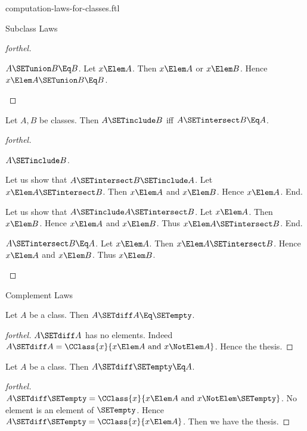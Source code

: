 \documentclass{stex}
\begin{document}
\begin{smodule}{computation-laws-for-classes.ftl}
\begin{sfragment}{Subclass Laws}
\begin{proof}[forthel]
    \begin{case}{$A \SETunion B \Eq B$.}
      Let $x \Elem A$.
      Then $x \Elem A$ or $x \Elem B$.
      Hence $x \Elem A \SETunion B \Eq B$.
    \end{case}
  \end{proof}

  \begin{proposition}[forthel]
    Let $A, B$ be classes.
    Then $A \SETinclude B$ iff $A \SETintersect B \Eq A$.
  \end{proposition}
  \begin{proof}[forthel]
    \begin{case}{$A \SETinclude B$.}

      Let us show that $A \SETintersect B \SETinclude A$.
        Let $x \Elem A \SETintersect B$.
        Then $x \Elem A$ and $x \Elem B$.
        Hence $x \Elem A$.
      End.

      Let us show that $A \SETinclude A \SETintersect B$.
        Let $x \Elem A$.
        Then $x \Elem B$.
        Hence $x \Elem A$ and $x \Elem B$.
        Thus $x \Elem A \SETintersect B$.
      End.
    \end{case}

    \begin{case}{$A \SETintersect B \Eq A$.}
      Let $x \Elem A$.
      Then $x \Elem A \SETintersect B$.
      Hence $x \Elem A$ and $x \Elem B$.
      Thus $x \Elem B$.
    \end{case}
  \end{proof}
\end{sfragment}

\begin{sfragment}{Complement Laws}
  \begin{proposition}[forthel]
    Let $A$ be a class.
    Then $A \SETdiff A \Eq \SETempty$.
  \end{proposition}
  \begin{proof}[forthel]
    $A \SETdiff A$ has no elements.
    Indeed $A \SETdiff A = \CClass{x}{x \Elem A\text{ and }x \NotElem A}$.
    Hence the thesis.
  \end{proof}

  \begin{proposition}[forthel]
    Let $A$ be a class.
    Then $A \SETdiff \SETempty \Eq A$.
  \end{proposition}
  \begin{proof}[forthel]
    $A \SETdiff \SETempty = \CClass{x}{x \Elem A\text{ and }x \NotElem \SETempty}$.
    No element is an element of $\SETempty$.
    Hence $A \SETdiff \SETempty = \CClass{x}{x \Elem A}$.
    Then we have the thesis.
  \end{proof}


\end{sfragment}
\end{smodule}
\end{document}
